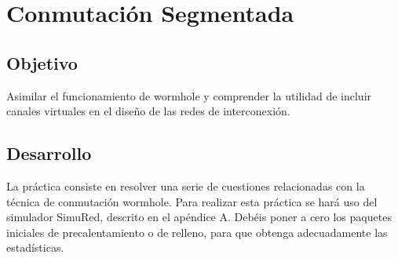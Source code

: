 \section{Conmutación Segmentada}\label{sec:p01intro}

\subsection{Objetivo}\label{ssec:p01objetivo}

\normalsize Asimilar el funcionamiento de wormhole y comprender la utilidad de incluir canales virtuales
en el diseño de las redes de interconexión.


\subsection{Desarrollo}\label{ssec:p01desarrollo}

La práctica consiste en resolver una serie de cuestiones relacionadas con la técnica de
conmutación wormhole. Para realizar esta práctica se hará uso del simulador SimuRed, descrito en
el apéndice A. Debéis poner a cero los paquetes iniciales de precalentamiento o de relleno, para que
obtenga adecuadamente las estadísticas.

